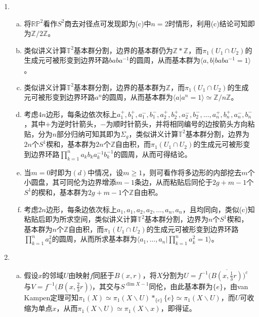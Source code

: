 \documentclass[a4paper,UTF8,fontset=windows]{ctexart}
\begin{document}
\begin{enumerate}[(1)]
    \item
    \begin{enumerate}[(a)]
    \item
    将$\mathbb{RP}^2$看作$S^2$商去对径点可发现即为(c)中$n=2$时情形，利用(c)结论可知即为$\mathbb{Z}/2\mathbb{Z}$。
    
    \item
    类似讲义计算$\mathbb{T}^2$基本群分割，边界的基本群仍为$\mathbb{Z}*\mathbb{Z}$，而$\pi_1(U_1\cap U_2)$的生成元可被形变到边界环路$baba^{-1}$的圆周，从而基本群为$\langle a,b|baba^{-1}=1\rangle$。
    
    \item
    类似讲义计算$\mathbb{T}^2$基本群分割，边界的基本群为$\mathbb{Z}$，而$\pi_1(U_1\cap U_2)$的生成元可被形变到边界环路$a^n$的圆周，从而基本群为$\langle a|a^n=1\rangle\simeq\mathbb{Z}/n\mathbb{Z}$。
    
    \item
    考虑$4n$边形，每条边依次标上$a_1^+,b_1^+,a_1^-,b_1^-,a_2^+,b_2^+,a_2^-,b_2^-,\dots,a_n^+,b_n^+,a_n^-,b_n^-$，其中$+$为逆时针箭头，$-$为顺时针箭头，并将相同编号的边按箭头方向粘贴，分为$n$部分归纳可知其即为$\Sigma_g$，类似讲义计算$\mathbb{T}^2$基本群分割，边界为$2n$个$S^1$楔和，基本群为$2n$个$\mathbb{Z}$自由积，而$\pi_1(U_1\cap U_2)$的生成元可被形变到边界环路$\prod_{k=1}^na_kb_ka_k^{-1}b_k^{-1}$的圆周，从而可得结论。
    
    \item
    当$m=0$时即为$(d)$中情况，设$m\ge1$，则可看作将多边形的内部挖去$m$个小圆盘，其可同伦为边界增添$m-1$条边，从而粘贴后同伦于$2g+m-1$个$S^1$的楔和，基本群为$2g+m-1$个$\mathbb{Z}$自由积。
    
    \item
    考虑$2n$边形，每条边依次标上$a_1,a_1,a_2,a_2,\dots,a_n,a_n$，且均同向，类似(c)知粘贴后即为所求空间，类似讲义计算$\mathbb{T}^2$基本群分割，边界为$n$个$S^1$楔和，基本群为$n$个$\mathbb{Z}$自由积，而$\pi_1(U_1\cap U_2)$的生成元可被形变到边界环路$\prod_{k=1}^na_k^2$的圆周，从而所求基本群为$\langle a_1,\dots,a_n|\prod_{k=1}^na_k^2=1\rangle$。
    \end{enumerate}
    
    \item
    \begin{enumerate}[(a)]
    \item
    假设$x$的邻域$U$由映射$f$同胚于$B(x,r)$，将$X$分割为$U=f^{-1}\big(\overline{B(x,\frac{1}{3}r)}\big)^c$与$V=f^{-1}\big(B(x,\frac{2}{3}r)\big)$，其交与$S^{\dim X-1}$同伦，由此基本群为$\{e\}$，由van Kampen定理可知$\pi_1(X)\simeq\pi_1(X\backslash U)*_{\{e\}}\{e\}\simeq\pi_1(X\backslash U)$，而$U$可收缩为单点$x$，从而$\pi_1(X\backslash U)\simeq\pi_1(X\backslash x)$，即得证。
    

\end{enumerate}
\end{enumerate}
\end{document}
